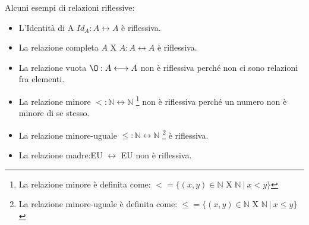 \begin{example}
Alcuni esempi di relazioni riflessive:
    \begin{itemize}
        \item L'Identità di A $Id_A: A \longleftrightarrow A$ è riflessiva.
        \item La relazione completa $A$ X $A:A \longleftrightarrow A$ è riflessiva.
        \item La relazione vuota $\O: A \longleftrightarrow A$ non è riflessiva perché non ci sono relazioni fra elementi.
        \item La relazione minore $<: \mathbb{N} \longleftrightarrow \mathbb{N}$ \footnote{La relazione minore è definita come: $< = \{(x,y) \in \mathbb{N}$ X $\mathbb{N}\:|\: x < y\}$} non è riflessiva perché un numero non è minore di se stesso.
        \item La relazione minore-uguale $\leq: \mathbb{N} \longleftrightarrow \mathbb{N}$ \footnote{La relazione minore-uguale è definita come: $\leq = \{(x,y) \in \mathbb{N}$ X $\mathbb{N}\:|\: x \leq y\}$} è riflessiva.
        \item La relazione madre:EU $\longleftrightarrow$ EU non è riflessiva.
    \end{itemize}
\end{example}

\newpage
